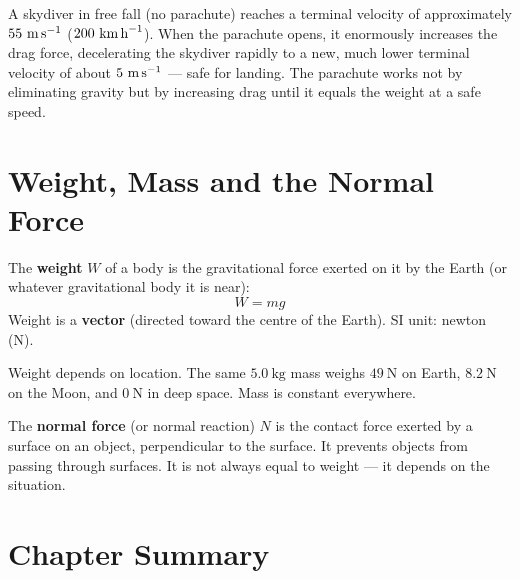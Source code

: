 \begin{realworldbox}
A skydiver in free fall (no parachute) reaches a
terminal velocity of approximately $55\ \text{m\,s}^{-1}$
($200\ \text{km\,h}^{-1}$). When the parachute opens,
it enormously increases the drag force, decelerating
the skydiver rapidly to a new, much lower terminal
velocity of about $5\ \text{m\,s}^{-1}$ --- safe for
landing. The parachute works not by eliminating gravity
but by increasing drag until it equals the weight at a
safe speed.
\end{realworldbox}

\section{Weight, Mass and the Normal Force}

\begin{definitionbox}[Weight]
The \textbf{weight} $W$ of a body is the gravitational
force exerted on it by the Earth (or whatever
gravitational body it is near):
\[
  W = mg
\]
Weight is a \textbf{vector} (directed toward the centre
of the Earth). SI unit: newton (N).

Weight depends on location. The same $5.0\ \text{kg}$
mass weighs $49\ \text{N}$ on Earth, $8.2\ \text{N}$
on the Moon, and $0\ \text{N}$ in deep space.
Mass is constant everywhere.
\end{definitionbox}

\begin{definitionbox}
The \textbf{normal force} (or normal reaction) $N$ is
the contact force exerted by a surface on an object,
perpendicular to the surface. It prevents objects from
passing through surfaces. It is not always equal to
weight --- it depends on the situation.
\end{definitionbox}

\section{Chapter Summary}

